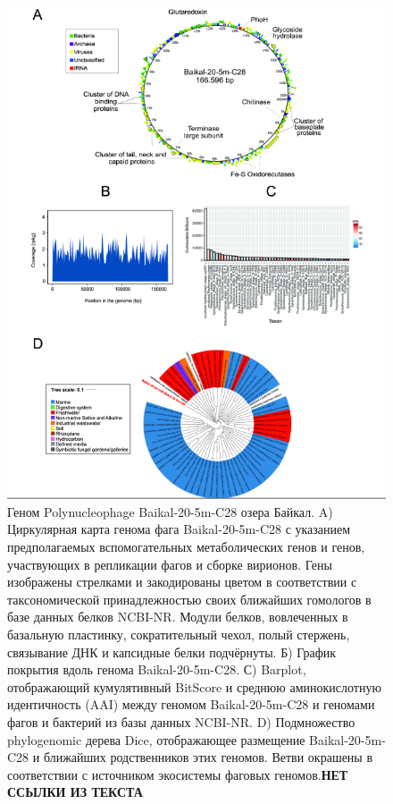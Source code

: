 \documentclass[a4paper,12pt,openany,final]{extreport}
\def\oldcaption{} \let\oldcaption=\caption
\def\caption{\stepcounter{captionsnum}\oldcaption}
\begin{document}
\begin{figure}\centering
\includegraphics[width=0.8\linewidth]{media/image11.png}

\caption{Геном Polynucleophage Baikal-20-5m-C28 озера Байкал. A)
Циркулярная карта генома фага Baikal-20-5m-C28 с указанием
предполагаемых вспомогательных метаболических генов и генов, участвующих
в репликации фагов и сборке вирионов. Гены изображены стрелками и
закодированы цветом в соответствии с таксономической принадлежностью
своих ближайших гомологов в базе данных белков NCBI-NR. Модули белков,
вовлеченных в базальную пластинку, сократительный чехол, полый стержень,
связывание ДНК и капсидные белки подчёрнуты. Б) График покрытия вдоль
генома Baikal-20-5m-C28. С) Barplot, отображающий кумулятивный BitScore
и среднюю аминокислотную идентичность (AAI) между геномом
Baikal-20-5m-C28 и геномами фагов и бактерий из базы данных NCBI-NR. D)
Подмножество phylogenomic дерева Dice, отображающее размещение
Baikal-20-5m-C28 и ближайших родственников этих геномов. Ветви окрашены
в соответствии с источником экосистемы фаговых геномов.\textbf{НЕТ ССЫЛКИ ИЗ ТЕКСТА}}\label{fig:4-6}
\end{figure}
\end{document}
